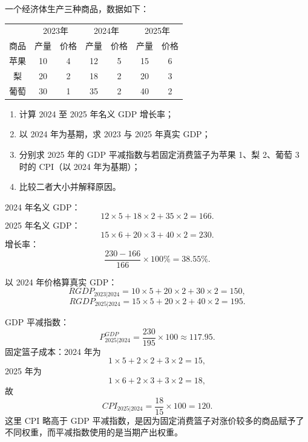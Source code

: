 \begin{question}
一个经济体生产三种商品，数据如下：
\begin{center}
\begin{tabular}{c|cc|cc|cc}
 & \multicolumn{2}{c|}{2023年} & \multicolumn{2}{c|}{2024年} & \multicolumn{2}{c}{2025年} \\
商品 & 产量 & 价格 & 产量 & 价格 & 产量 & 价格 \\\hline
苹果 & 10 & 4 & 12 & 5 & 15 & 6 \\
梨 & 20 & 2 & 18 & 2 & 20 & 3 \\
葡萄 & 30 & 1 & 35 & 2 & 40 & 2
\end{tabular}
\end{center}
\begin{enumerate}[label=(\alph*),leftmargin=2.5em]
  \item 计算 2024 至 2025 年名义 GDP 增长率；
  \item 以 2024 年为基期，求 2023 与 2025 年真实 GDP；
  \item 分别求 2025 年的 GDP 平减指数与若固定消费篮子为苹果 1、梨 2、葡萄 3 时的 CPI（以 2024 年为基期）；
  \item 比较二者大小并解释原因。
\end{enumerate}
\begin{solution}
2024 年名义 GDP：
\[
12\times5+18\times2+35\times2=166.
\]
2025 年名义 GDP：
\[
15\times6+20\times3+40\times2=230.
\]
增长率：
\[
\frac{230-166}{166}\times100\%=38.55\%.
\]

以 2024 年价格算真实 GDP：
\[
RGDP_{2023|2024}=10\times5+20\times2+30\times2=150,
\]
\[
RGDP_{2025|2024}=15\times5+20\times2+40\times2=195.
\]

GDP 平减指数：
\[
P^{GDP}_{2025|2024}=\frac{230}{195}\times100\approx117.95.
\]
固定篮子成本：2024 年为
\[
1\times5+2\times2+3\times2=15,
\]
2025 年为
\[
1\times6+2\times3+3\times2=18,
\]
故
\[
CPI_{2025|2024}=\frac{18}{15}\times100=120.
\]
这里 CPI 略高于 GDP 平减指数，是因为固定消费篮子对涨价较多的商品赋予了不同权重，而平减指数使用的是当期产出权重。
\end{solution}
\end{question}

